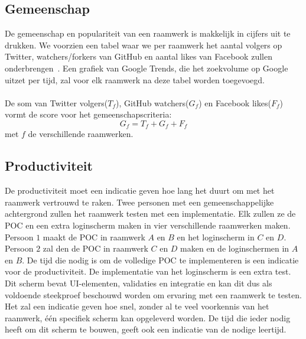 \subsection{Gemeenschap}
\label{sec:vergelijking-gemeenschap}
De gemeenschap en populariteit van een raamwerk is makkelijk in cijfers uit te drukken. 
We voorzien een tabel waar we per raamwerk het aantal volgers op Twitter, watchers/forkers van GitHub en aantal likes van Facebook zullen onderbrengen~\cite{Sarrafi2012a,Ayuso2012}. 
Een grafiek van Google Trends, die het zoekvolume op Google uitzet per tijd, zal voor elk raamwerk na deze tabel worden toegevoegd.
\paragraph{}
De som van Twitter volgers($T_f$), GitHub watchers($G_f$) en Facebook likes($F_f$) vormt de score voor het gemeenschapscriteria:
\begin{equation}
  G_f={T_f+G_f+F_f}
  \label{eq:gemeenschap}
\end{equation}
met $f$ de verschillende raamwerken.

\subsection{Productiviteit}
\label{sec:vergelijking-productiviteit}
De productiviteit moet een indicatie geven hoe lang het duurt om met het raamwerk vertrouwd te raken. 
Twee personen met een gemeenschappelijke achtergrond zullen het raamwerk testen met een implementatie.
Elk zullen ze de POC en een extra loginscherm maken in vier verschillende raamwerken maken.
Persoon $1$ maakt de POC in raamwerk $A$ en $B$ en het loginscherm in $C$ en $D$.
Persoon $2$ zal den de POC in raamwerk $C$ en $D$ maken en de loginschermen in $A$ en $B$.
De tijd die nodig is om de volledige POC te implementeren is een indicatie voor de productiviteit. 
De implementatie van het loginscherm is een extra test.
Dit scherm bevat UI-elementen, validaties en  integratie en kan dit dus als voldoende steekproef beschouwd worden om ervaring met een raamwerk te testen.
Het zal een indicatie geven hoe snel,  zonder al te veel voorkennis van het raamwerk,  één specifiek scherm kan opgeleverd worden.
De tijd die ieder nodig heeft om dit scherm te bouwen, geeft ook een indicatie van de nodige leertijd.
